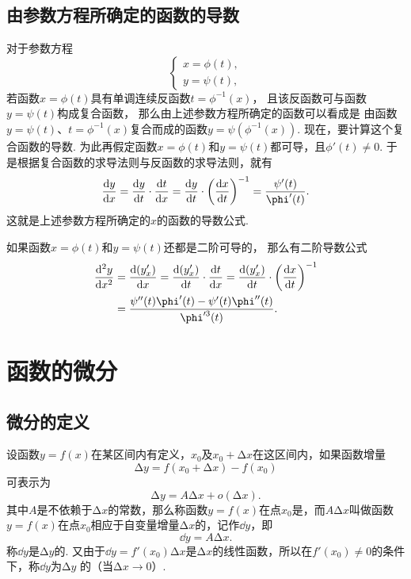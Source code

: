 \subsection{由参数方程所确定的函数的导数}
对于参数方程\[
	\left\{ \begin{array}{l}
		x = \phi(t), \\
		y = \psi(t),
	\end{array} \right.
\]
若函数\(x = \phi(t)\)具有单调连续反函数\(t=\phi^{-1}(x)\)，
且该反函数可与函数\(y = \psi(t)\)构成复合函数，
那么由上述参数方程所确定的函数可以看成是
由函数\(y=\psi(t)\)、\(t=\phi^{-1}(x)\)复合而成的函数\(y=\psi(\phi^{-1}(x))\).
现在，要计算这个复合函数的导数.
为此再假定函数\(x = \phi(t)\)和\(y = \psi(t)\)都可导，且\(\phi'(t) \neq 0\).
于是根据复合函数的求导法则与反函数的求导法则，就有\begin{equation}
	\dv{y}{x} = \dv{y}{t} \cdot \dv{t}{x}
	= \dv{y}{t} \cdot \left(\dv{x}{t}\right)^{-1}
	= \frac{\psi'(t)}{\phi'(t)}.
\end{equation}
这就是上述参数方程所确定的\(x\)的函数的导数公式.

如果函数\(x = \phi(t)\)和\(y = \psi(t)\)还都是二阶可导的，
那么有二阶导数公式
\begin{equation}
	\begin{split}
		\dv[2]{y}{x}
		&= \dv{(y'_x)}{x}
		= \dv{(y'_x)}{t} \cdot \dv{t}{x}
		= \dv{(y'_x)}{t} \cdot \left(\dv{x}{t}\right)^{-1} \\
		&= \frac{\psi''(t) \phi'(t) - \psi'(t) \phi''(t)}{\phi'^3(t)}.
	\end{split}
\end{equation}

\section{函数的微分}
\subsection{微分的定义}
\begin{definition}
设函数\(y=f(x)\)在某区间内有定义，\(x_0\)及\(x_0+\increment x\)在这区间内，如果函数增量\[
\increment y=f(x_0+\increment x)-f(x_0)
\]可表示为\[
\increment y=A\increment x+o(\increment x).
\]其中\(A\)是不依赖于\(\increment x\)的常数，那么称函数\(y=f(x)\)在点\(x_0\)是，而\(A\increment x\)叫做函数\(y=f(x)\)在点\(x_0\)相应于自变量增量\(\increment x\)的，记作\(\dd{y}\)，即\[
\dd{y}=A\increment x.
\]称\(\dd{y}\)是\(\increment y\)的.
又由于\(\dd{y}=f'(x_0)\increment x\)是\(\increment x\)的线性函数，所以在\(f'(x_0) \neq 0\)的条件下，称\(\dd{y}\)为\(\increment y\) 的（当\(\increment x\to0\)）.
\end{definition}

